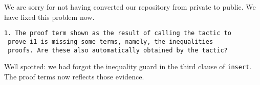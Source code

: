 \documentclass{article}
\begin{document}
We are sorry for not having converted our repository from private
to public.  We have fixed this problem now.

\begin{verbatim}
1. The proof term shown as the result of calling the tactic to
 prove i1 is missing some terms, namely, the inequalities
 proofs. Are these also automatically obtained by the tactic?
\end{verbatim}

Well spotted: we had forgot the inequality guard in the third clause of
\texttt{insert}. The proof terms now reflects those evidence.
\end{document}
